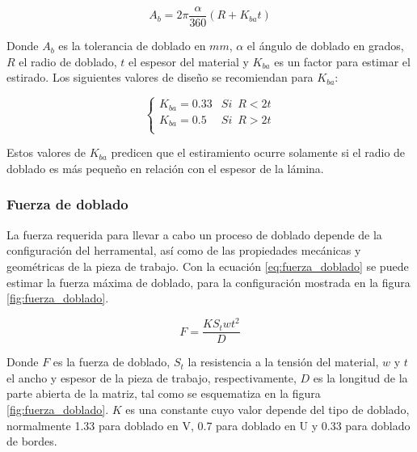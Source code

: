 \begin{equation}\label{eq:tol_dob}
A_b = 2\pi \frac{\alpha}{360} \left( R + K_{ba} t \right)
\end{equation}

Donde $A_b$ es la tolerancia de doblado en $mm$, $\alpha$ el ángulo de doblado en grados, 
$R$ el radio de doblado, $t$ el espesor del material y $K_{ba}$ es un factor para estimar 
el estirado. Los siguientes valores de diseño se recomiendan para $K_{ba}$: ~\cite{groover2007}

$$
\left\{
\begin{matrix}
K_{ba} = 0.33 & Si \,\,\, R<2t \\
K_{ba} = 0.5 & Si \,\,\, R>2t \\
\end{matrix} \right.
$$

Estos valores de $K_{ba}$ predicen que el estiramiento ocurre solamente si el radio de doblado 
es más pequeño en relación con el espesor de la lámina.

\subsubsection{Fuerza de doblado}

La fuerza requerida para llevar a cabo un proceso de doblado depende de la configuración del 
herramental, así como de las propiedades mecánicas y geométricas de la pieza de trabajo. 
Con la ecuación \ref{eq:fuerza_doblado} se puede estimar la fuerza máxima de doblado, para 
la configuración mostrada en la figura \ref{fig:fuerza_doblado}.

\begin{equation}\label{eq:fuerza_doblado}
F = \frac{K S_{t} w t^2}{D}
\end{equation}

Donde $F$ es la fuerza de doblado, $S_t$ la resistencia a la tensión del material, $w$ y $t$ el 
ancho y espesor de la pieza de trabajo, respectivamente, $D$ es la longitud de la parte abierta 
de la matriz, tal como se esquematiza en la figura \ref{fig:fuerza_doblado}. $K$ es una constante 
cuyo valor depende del tipo de doblado, normalmente 1.33 para doblado en V, 0.7 para doblado en 
U y 0.33 para doblado de bordes. ~\cite{groover2007} ~\cite{kalpakjian2008}

